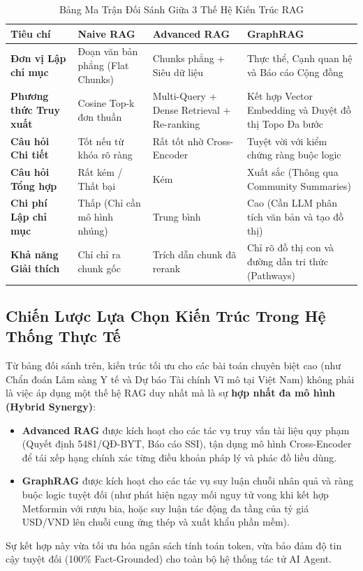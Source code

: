 \documentclass[12pt,a4paper]{report}
\begin{document}
\begin{table}[H]
\centering
\small
\renewcommand{\arraystretch}{1.3}
\caption{Bảng Ma Trận Đối Sánh Giữa 3 Thế Hệ Kiến Trúc RAG}
\label{tab:rag_matrix}
\begin{tabularx}{\textwidth}{>{\RaggedRight\arraybackslash\bfseries}p{3.4cm} Y Y Y}
\toprule
\textbf{Tiêu chí} & \textbf{Naive RAG} & \textbf{Advanced RAG} & \textbf{GraphRAG} \\
\midrule
Đơn vị Lập chỉ mục & Đoạn văn bản phẳng (Flat Chunks) & Chunks phẳng + Siêu dữ liệu & Thực thể, Cạnh quan hệ và Báo cáo Cộng đồng \\
Phương thức Truy xuất & Cosine Top-k đơn thuần & Multi-Query + Dense Retrieval + Re-ranking & Kết hợp Vector Embedding và Duyệt đồ thị Topo Đa bước \\
Câu hỏi Chi tiết & Tốt nếu từ khóa rõ ràng & Rất tốt nhờ Cross-Encoder & Tuyệt vời với kiểm chứng ràng buộc logic \\
Câu hỏi Tổng hợp & Rất kém / Thất bại & Kém & Xuất sắc (Thông qua Community Summaries) \\
Chi phí Lập chỉ mục & Thấp (Chỉ cần mô hình nhúng) & Trung bình & Cao (Cần LLM phân tích văn bản và tạo đồ thị) \\
Khả năng Giải thích & Chỉ chỉ ra chunk gốc & Trích dẫn chunk đã rerank & Chỉ rõ đồ thị con và đường dẫn tri thức (Pathways) \\
\bottomrule
\end{tabularx}
\end{table}

\subsection{Chiến Lược Lựa Chọn Kiến Trúc Trong Hệ Thống Thực Tế}

Từ bảng đối sánh trên, kiến trúc tối ưu cho các bài toán chuyên biệt cao (như Chẩn đoán Lâm sàng Y tế và Dự báo Tài chính Vĩ mô tại Việt Nam) không phải là việc áp dụng một thế hệ RAG duy nhất mà là sự \textbf{hợp nhất đa mô hình (Hybrid Synergy)}:
\begin{itemize}[itemsep=2pt, parsep=0pt, topsep=3pt]
    \item \textbf{Advanced RAG} được kích hoạt cho các tác vụ truy vấn tài liệu quy phạm (Quyết định 5481/QĐ-BYT, Báo cáo SSI), tận dụng mô hình Cross-Encoder để tái xếp hạng chính xác từng điều khoản pháp lý và phác đồ liều dùng.
    \item \textbf{GraphRAG} được kích hoạt cho các tác vụ suy luận chuỗi nhân quả và ràng buộc logic tuyệt đối (như phát hiện ngay mối nguy tử vong khi kết hợp Metformin với rượu bia, hoặc suy luận tác động đa tầng của tỷ giá USD/VND lên chuỗi cung ứng thép và xuất khẩu phần mềm).
\end{itemize}
Sự kết hợp này vừa tối ưu hóa ngân sách tính toán token, vừa bảo đảm độ tin cậy tuyệt đối (100\% Fact-Grounded) cho toàn bộ hệ thống tác tử AI Agent.
\end{document}
